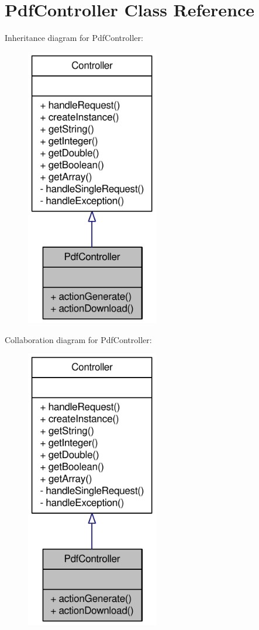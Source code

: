\hypertarget{classPdfController}{
\section{PdfController Class Reference}
\label{classPdfController}
}


Inheritance diagram for PdfController:\nopagebreak
\begin{figure}[H]
\begin{center}
\leavevmode
\includegraphics[width=164pt]{classPdfController__inherit__graph}
\end{center}
\end{figure}


Collaboration diagram for PdfController:\nopagebreak
\begin{figure}[H]
\begin{center}
\leavevmode
\includegraphics[width=164pt]{classPdfController__coll__graph}
\end{center}
\end{figure}
